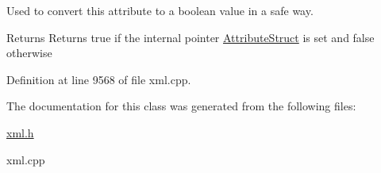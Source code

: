 Used to convert this attribute to a boolean value in a safe way. 

\begin{DoxyReturn}{Returns}
Returns true if the internal pointer \hyperlink{structphys_1_1xml_1_1AttributeStruct}{AttributeStruct} is set and false otherwise 
\end{DoxyReturn}


Definition at line 9568 of file xml.cpp.



The documentation for this class was generated from the following files:\begin{DoxyCompactItemize}
\item 
\hyperlink{xml_8h}{xml.h}\item 
xml.cpp\end{DoxyCompactItemize}
